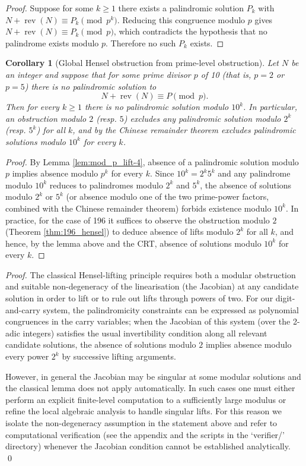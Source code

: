 \documentclass[12pt,a4paper]{article}
\newtheorem{corollary}[theorem]{Corollary}
\begin{document}
\begin{proof}
Suppose for some $k\ge1$ there exists a palindromic solution $P_k$ with
$N+\operatorname{rev}(N)\equiv P_k\pmod{p^k}$. Reducing this congruence modulo $p$ gives
$N+\operatorname{rev}(N)\equiv P_k\pmod p$, which contradicts the hypothesis that no palindrome exists modulo $p$. Therefore no such $P_k$ exists.
\end{proof}

\begin{corollary}[Global Hensel obstruction from prime-level obstruction]\label{cor:prime_to_power-6}
Let $N$ be an integer and suppose that for some prime divisor $p$ of 10 (that is, $p=2$ or $p=5$) there is no palindromic solution to
$$N+\operatorname{rev}(N)\equiv P\pmod p.$$ 
Then for every $k\ge1$ there is no palindromic solution modulo $10^k$. In particular, an obstruction modulo $2$ (resp. $5$) excludes any palindromic solution modulo $2^k$ (resp. $5^k$) for all $k$, and by the Chinese remainder theorem excludes palindromic solutions modulo $10^k$ for every $k$.
\end{corollary}

\begin{proof}
By Lemma \ref{lem:mod_p_lift-4}, absence of a palindromic solution modulo $p$ implies absence modulo $p^k$ for every $k$. Since $10^k=2^k5^k$ and any palindrome modulo $10^k$ reduces to palindromes modulo $2^k$ and $5^k$, the absence of solutions modulo $2^k$ or $5^k$ (or absence modulo one of the two prime-power factors, combined with the Chinese remainder theorem) forbids existence modulo $10^k$. In practice, for the case of 196 it suffices to observe the obstruction modulo $2$ (Theorem \ref{thm:196_hensel}) to deduce absence of lifts modulo $2^k$ for all $k$, and hence, by the lemma above and the CRT, absence of solutions modulo $10^k$ for every $k$.
\end{proof}

\begin{proof}
The classical Hensel-lifting principle requires both a modular obstruction and suitable non-degeneracy of the linearisation (the Jacobian) at any candidate solution in order to lift or to rule out lifts through powers of two. For our digit-and-carry system, the palindromicity constraints can be expressed as polynomial congruences in the carry variables; when the Jacobian of this system (over the 2-adic integers) satisfies the usual invertibility condition along all relevant candidate solutions, the absence of solutions modulo $2$ implies absence modulo every power $2^k$ by successive lifting arguments.

However, in general the Jacobian may be singular at some modular solutions and the classical lemma does not apply automatically. In such cases one must either perform an explicit finite-level computation to a sufficiently large modulus or refine the local algebraic analysis to handle singular lifts. For this reason we isolate the non-degeneracy assumption in the statement above and refer to computational verification (see the appendix and the scripts in the `verifier/' directory) whenever the Jacobian condition cannot be established analytically.
\qed
\end{proof}
\end{document}
